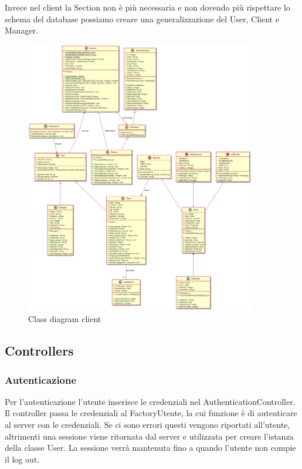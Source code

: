 \documentclass[12pt, a4paper]{report}
\begin{document}
Invece nel client la Section non è più necessaria e non dovendo più rispettare
lo schema del database possiamo creare una generalizzazione del User, Client e
Manager.

\begin{figure}[hb]
  \centering
  \includegraphics[width=0.9\textwidth]{client_models_class.png}
  \caption{Class diagram client}
\end{figure}

\newpage


\subsection{Controllers}

\subsubsection{Autenticazione}

Per l'autenticazione l'utente inserisce le credenziali nel
AuthenticationController. Il controller passa le credenziali al FactoryUtente,
la cui funzione è di autenticare al server con le credenziali. Se ci sono
errori questi vengono riportati all'utente, altrimenti una sessione viene
ritornata dal server e utilizzata per creare l'istanza della classe User. La
sessione verrà mantenuta fino a quando l'utente non compie il log out.
\end{document}
